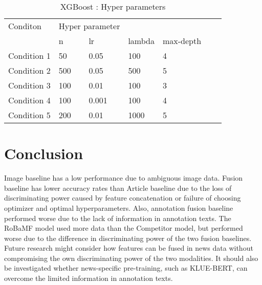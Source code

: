 \documentclass{article}
\begin{document}
\begin{table}[htbp]
\centering
\caption{XGBoost : Hyper parameters}
\label{your-label}
\begin{tabular}{@{}lllllll@{}}
\toprule
Conditon     & \multicolumn{2}{c}{Hyper parameter} \\
             & n      & lr      & lambda      & max-depth     \\
Condition 1   & 50         & 0.05         & 100         & 4        \\
Condition 2   & 500         & 0.05         & 500         & 5       \\
Condition 3   & 100         & 0.01         & 100         & 3       \\
Condition 4   & 100         & 0.001        & 100         & 4       \\
Condition 5   & 200         & 0.01        & 1000         & 5       \\
\bottomrule
\end{tabular}
\end{table}

\section{Conclusion}
Image baseline has a low performance due to ambiguous image data. Fusion baseline has lower accuracy rates than Article baseline due to the loss of discriminating power caused by feature concatenation or failure of choosing optimizer and optimal hyperparameters. Also, annotation fusion baseline performed worse due to the lack of information in annotation texts.
The RoBaMF model used more data than the Competitor model, but performed worse due to the difference in discriminating power of the two fusion baselines.
Future research might consider how features can be fused in news data without compromising the own discriminating power of the two modalities.
It should also be investigated whether news-specific pre-training, such as KLUE-BERT, can overcome the limited information in annotation texts.















\end{document}
